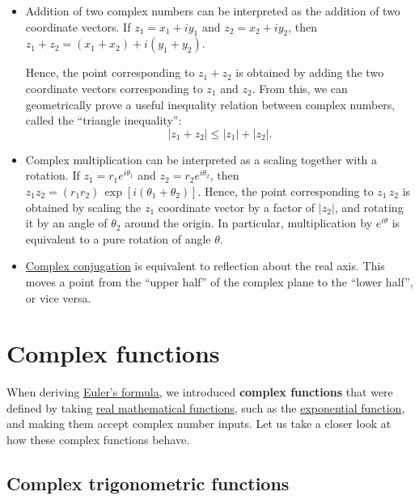 \documentclass[10pt,a4paper]{article}
\begin{document}
\begin{itemize}
\item
  Addition of two complex numbers can be interpreted as the addition
  of two coordinate vectors. If $z_1 = x_1 + i y_1$ and $z_2 = x_2 + i
  y_2$, then $z_1 + z_2 = \left(x_1 + x_2\right) + i\left(y_1 +
  y_2\right).$

  Hence, the point corresponding to $z_1 + z_2$ is obtained by adding
  the two coordinate vectors corresponding to $z_1$ and $z_2$. From
  this, we can geometrically prove a useful inequality relation
  between complex numbers, called the ``triangle inequality'':
  \begin{equation}
    |z_1 + z_2| \le |z_1| + |z_2|.
  \end{equation}

\item
  Complex multiplication can be interpreted as a scaling together with
  a rotation. If $z_1 = r_1e^{i\theta_1}$ and $z_2 =
  r_2e^{i\theta_2}$, then $z_1 z_2 = \left(r_1 r_2\right)
  \,\exp[i(\theta_1 + \theta_2)]$.  Hence, the point corresponding to
  $z_1 \, z_2$ is obtained by scaling the $z_1$ coordinate vector by a
  factor of $|z_2|$, and rotating it by an angle of $\theta_2$ around
  the origin. In particular, multiplication by $e^{i\theta}$ is
  equivalent to a pure rotation of angle $\theta$.

\item
  \hyperref[magnitudes-and-conjugates]{Complex conjugation} is
  equivalent to reflection about the real axis. This moves a point
  from the ``upper half'' of the complex plane to the ``lower half'',
  or vice versa.
\end{itemize}

\section{Complex functions}\label{complex-functions}

When deriving \protect\hyperlink{euler_formula}{Euler's formula}, we
introduced \textbf{complex functions} that were defined by taking
\href{00_mathfunctions.ipynb}{real mathematical functions}, such as the
\href{00_mathfunctions.ipynb\#exponential}{exponential function}, and
making them accept complex number inputs. Let us take a closer look at
how these complex functions behave.

\subsection{Complex trigonometric functions}
\label{complex-trigonometric-functions}
\end{document}
